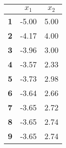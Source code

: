 \begin{small}\begin{tabular}{|l|c|c|}
\hline
&\textbf{$x_1$}&\textbf{$x_2$}\\\hline
\textbf{1}&-5.00&5.00\\\hline
\textbf{2}&-4.17&4.00\\\hline
\textbf{3}&-3.96&3.00\\\hline
\textbf{4}&-3.57&2.33\\\hline
\textbf{5}&-3.73&2.98\\\hline
\textbf{6}&-3.64&2.66\\\hline
\textbf{7}&-3.65&2.72\\\hline
\textbf{8}&-3.65&2.74\\\hline
\textbf{9}&-3.65&2.74\\\hline
\end{tabular}
\end{small}